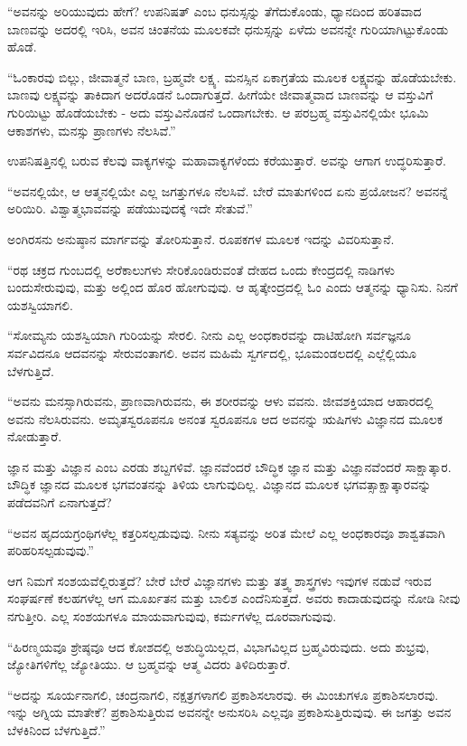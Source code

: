 “ಅವನನ್ನು ಅರಿಯುವುದು ಹೇಗೆ? ಉಪನಿಷತ್ ಎಂಬ ಧನುಸ್ಸನ್ನು ತೆಗೆದುಕೊಂಡು, ಧ್ಯಾನದಿಂದ ಹರಿತವಾದ ಬಾಣವನ್ನು ಅದರಲ್ಲಿ ಇರಿಸಿ, ಅವನ ಚಿಂತನೆಯ ಮೂಲಕವೇ ಧನುಸ್ಸನ್ನು ಏಳೆದು ಅವನನ್ನೇ ಗುರಿಯಾಗಿಟ್ಟುಕೊಂಡು ಹೊಡೆ.

“ಓಂಕಾರವು ಬಿಲ್ಲು, ಜೀವಾತ್ಮನೆ ಬಾಣ, ಬ್ರಹ್ಮವೇ ಲಕ್ಷ್ಯ. ಮನಸ್ಸಿನ ಏಕಾಗ್ರತೆಯ ಮೂಲಕ ಲಕ್ಷ್ಯವನ್ನು ಹೊಡೆಯಬೇಕು. ಬಾಣವು ಲಕ್ಷ್ಯವನ್ನು ತಾಕಿದಾಗ ಅದರೊಡನೆ ಒಂದಾಗುತ್ತದೆ. ಹೀಗೆಯೇ ಜೀವಾತ್ಮವಾದ ಬಾಣವನ್ನು ಆ ವಸ್ತುವಿಗೆ ಗುರಿಯಿಟ್ಟು ಹೊಡೆಯಬೇಕು - ಅದು ವಸ್ತುವಿನೊಡನೆ ಒಂದಾಗಬೇಕು. ಆ ಪರಬ್ರಹ್ಮ ವಸ್ತುವಿನಲ್ಲಿಯೇ ಭೂಮಿ ಆಕಾಶಗಳು, ಮನಸ್ಸು ಪ್ರಾಣಗಳು ನೆಲಸಿವೆ.”

ಉಪನಿಷತ್ತಿನಲ್ಲಿ ಬರುವ ಕೆಲವು ವಾಕ್ಯಗಳನ್ನು ಮಹಾವಾಕ್ಯಗಳೆಂದು ಕರೆಯುತ್ತಾರೆ. ಅವನ್ನು ಆಗಾಗ ಉದ್ಧರಿಸುತ್ತಾರೆ.

“ಅವನಲ್ಲಿಯೇ, ಆ ಆತ್ಮನಲ್ಲಿಯೇ ಎಲ್ಲ ಜಗತ್ತುಗಳೂ ನೆಲಸಿವೆ. ಬೇರೆ ಮಾತುಗಳಿಂದ ಏನು ಪ್ರಯೋಜನ? ಅವನನ್ನೆ ಅರಿಯಿರಿ. ವಿಶ್ವಾತ್ಮಭಾವವನ್ನು ಪಡೆಯುವುದಕ್ಕೆ ಇದೇ ಸೇತುವೆ.”

ಅಂಗಿರಸನು ಅನುಷ್ಠಾನ ಮಾರ್ಗವನ್ನು ತೋರಿಸುತ್ತಾನೆ. ರೂಪಕಗಳ ಮೂಲಕ ಇದನ್ನು ವಿವರಿಸುತ್ತಾನೆ.

“ರಥ ಚಕ್ರದ ಗುಂಬದಲ್ಲಿ ಅರೆಕಾಲುಗಳು ಸೇರಿಕೊಂಡಿರುವಂತೆ ದೇಹದ ಒಂದು ಕೇಂದ್ರದಲ್ಲಿ ನಾಡಿಗಳು ಬಂದುಸೇರುವುವು, ಮತ್ತು ಅಲ್ಲಿಂದ ಹೊರ ಹೋಗುವುವು. ಆ ಹೃತ್ಕೇಂದ್ರದಲ್ಲಿ ಓಂ ಎಂದು ಆತ್ಮನನ್ನು ಧ್ಯಾನಿಸು. ನಿನಗೆ ಯಶಸ್ವಿಯಾಗಲಿ.

“ಸೋಮ್ಯನು ಯಶಸ್ವಿಯಾಗಿ ಗುರಿಯನ್ನು ಸೇರಲಿ. ನೀನು ಎಲ್ಲ ಅಂಧಕಾರವನ್ನು ದಾಟಿಹೋಗಿ ಸರ್ವಜ್ಞನೂ ಸರ್ವವಿದನೂ ಆದವನನ್ನು ಸೇರುವಂತಾಗಲಿ. ಅವನ ಮಹಿಮೆ ಸ್ವರ್ಗದಲ್ಲಿ, ಭೂಮಂಡಲದಲ್ಲಿ ಎಲ್ಲೆಲ್ಲಿಯೂ ಬೆಳಗುತ್ತಿದೆ.

“ಅವನು ಮನಸ್ಸಾಗಿರುವನು, ಪ್ರಾಣವಾಗಿರುವನು, ಈ ಶರೀರವನ್ನು ಆಳು ವವನು. ಜೀವಶಕ್ತಿಯಾದ ಆಹಾರದಲ್ಲಿ ಅವನು ನೆಲಸಿರುವನು. ಅಮೃತಸ್ವರೂಪನೂ ಅನಂತ ಸ್ವರೂಪನೂ ಆದ ಅವನನ್ನು ಋಷಿಗಳು ವಿಜ್ಞಾನದ ಮೂಲಕ ನೋಡುತ್ತಾರೆ.

ಜ್ಞಾನ ಮತ್ತು ವಿಜ್ಞಾನ ಎಂಬ ಎರಡು ಶಬ್ದಗಳಿವೆ. ಜ್ಞಾನವೆಂದರೆ ಬೌದ್ಧಿಕ ಜ್ಞಾನ ಮತ್ತು ವಿಜ್ಞಾನವೆಂದರೆ ಸಾಕ್ಷಾತ್ಕಾರ. ಬೌದ್ಧಿಕ ಜ್ಞಾನದ ಮೂಲಕ ಭಗವಂತನನ್ನು ತಿಳಿಯ ಲಾಗುವುದಿಲ್ಲ. ವಿಜ್ಞಾನದ ಮೂಲಕ ಭಗವತ್ಸಾಕ್ಷಾತ್ಕಾರವನ್ನು ಪಡೆದವನಿಗೆ ಏನಾಗುತ್ತದೆ?

“ಅವನ ಹೃದಯಗ್ರಂಥಿಗಳೆಲ್ಲ ಕತ್ತರಿಸಲ್ಪಡುವುವು. ನೀನು ಸತ್ಯವನ್ನು ಅರಿತ ಮೇಲೆ ಎಲ್ಲ ಅಂಧಕಾರವೂ ಶಾಶ್ವತವಾಗಿ ಪರಿಹರಿಸಲ್ಪಡುವುವು.”

ಆಗ ನಿಮಗೆ ಸಂಶಯವೆಲ್ಲಿರುತ್ತದೆ? ಬೇರೆ ಬೇರೆ ವಿಜ್ಞಾನಗಳು ಮತ್ತು ತತ್ತ್ವ ಶಾಸ್ತ್ರಗಳು ಇವುಗಳ ನಡುವೆ ಇರುವ ಸಂಘರ್ಷಣೆ ಕಲಹಗಳೆಲ್ಲ ಆಗ ಮೂರ್ಖತನ ಮತ್ತು ಬಾಲಿಶ ಎಂದೆನಿಸುತ್ತದೆ. ಅವರು ಕಾದಾಡುವುದನ್ನು ನೋಡಿ ನೀವು ನಗುತ್ತೀರಿ. ಎಲ್ಲ ಸಂಶಯಗಳೂ ಮಾಯವಾಗುವುವು, ಕರ್ಮಗಳೆಲ್ಲ ದೂರವಾಗುವುವು.

“ಹಿರಣ್ಮಯವೂ ಶ್ರೇಷ್ಠವೂ ಆದ ಕೋಶದಲ್ಲಿ ಅಶುದ್ಧಿಯಿಲ್ಲದ, ವಿಭಾಗವಿಲ್ಲದ ಬ್ರಹ್ಮವಿರುವುದು. ಅದು ಶುಭ್ರವು, ಜ್ಯೋತಿಗಳಿಗೆಲ್ಲ ಜ್ಯೋತಿಯು. ಆ ಬ್ರಹ್ಮವನ್ನು ಆತ್ಮ ವಿದರು ತಿಳಿದಿರುತ್ತಾರೆ.

“ಅದನ್ನು ಸೂರ್ಯನಾಗಲಿ, ಚಂದ್ರನಾಗಲಿ, ನಕ್ಷತ್ರಗಳಾಗಲಿ ಪ್ರಕಾಶಿಸಲಾರವು. ಈ ಮಿಂಚುಗಳೂ ಪ್ರಕಾಶಿಸಲಾರವು. ಇನ್ನು ಅಗ್ನಿಯ ಮಾತೇಕೆ? ಪ್ರಕಾಶಿಸುತ್ತಿರುವ ಅವನನ್ನೇ ಅನುಸರಿಸಿ ಎಲ್ಲವೂ ಪ್ರಕಾಶಿಸುತ್ತಿರುವುವು. ಈ ಜಗತ್ತು ಅವನ ಬೆಳಕಿನಿಂದ ಬೆಳಗುತ್ತಿದೆ.”

